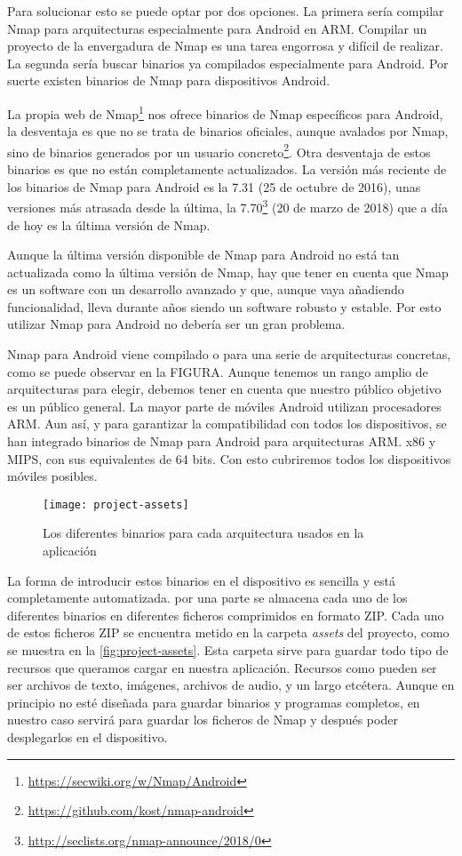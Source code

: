 Para solucionar esto se puede optar por dos opciones. La primera sería compilar Nmap para arquitecturas especialmente para Android en ARM. Compilar un proyecto de la envergadura de Nmap es una tarea engorrosa y difícil de realizar. La segunda sería buscar binarios ya compilados especialmente para Android. Por suerte existen binarios de Nmap para dispositivos Android.

La propia web de Nmap\footnote{\url{https://secwiki.org/w/Nmap/Android}} nos ofrece binarios de Nmap específicos para Android, la desventaja es que no se trata de binarios oficiales, aunque avalados por Nmap, sino de binarios generados por un usuario concreto\footnote{\url{https://github.com/kost/nmap-android}}. Otra desventaja de estos binarios es que no están completamente actualizados. La versión más reciente de los binarios de Nmap para Android es la 7.31 (25 de octubre de 2016), unas versiones más atrasada desde la última, la 7.70\footnote{\url{http://seclists.org/nmap-announce/2018/0}} (20 de marzo de 2018) que a día de hoy es la última versión de Nmap.

Aunque la última versión disponible de Nmap para Android no está tan actualizada como la última versión de Nmap, hay que tener en cuenta que Nmap es un software con un desarrollo avanzado y que, aunque vaya añadiendo funcionalidad, lleva durante años siendo un software robusto y estable. Por esto utilizar Nmap para Android no debería ser un gran problema.

Nmap para Android viene compilado o para una serie de arquitecturas concretas, como se puede observar en la FIGURA. Aunque tenemos un rango amplio de arquitecturas para elegir, debemos tener en cuenta que nuestro público objetivo es un público general. La mayor parte de móviles Android utilizan procesadores ARM. Aun así, y para garantizar la compatibilidad con todos los dispositivos, se han integrado binarios de Nmap para Android para arquitecturas ARM. x86 y MIPS, con sus equivalentes de 64 bits. Con esto cubriremos todos los dispositivos móviles posibles.

\begin{figure}[H]
	\centering
	\texttt{[image: project-assets]}
	\caption{Los diferentes binarios para cada arquitectura usados en la aplicación}
	\label{fig:project-assets}
\end{figure}

La forma de introducir estos binarios en el dispositivo es sencilla y está completamente automatizada. por una parte se almacena cada uno de los diferentes binarios en diferentes ficheros comprimidos en formato ZIP. Cada uno de estos ficheros ZIP se encuentra metido en la carpeta \textit{assets} del proyecto, como se muestra en la \autoref{fig:project-assets}. Esta carpeta sirve para guardar todo tipo de recursos que queramos cargar en nuestra aplicación. Recursos como pueden ser ser archivos de texto, imágenes, archivos de audio, y un largo etcétera. Aunque en principio no esté diseñada para guardar binarios y programas completos, en nuestro caso servirá para guardar los ficheros de Nmap y después poder desplegarlos en el dispositivo.


